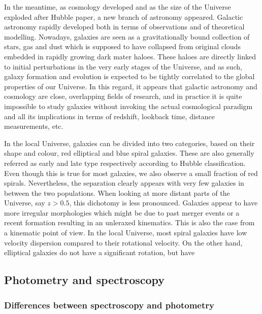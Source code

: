 In the meantime, as cosmology developed and as the size of the Universe exploded after Hubble paper, a new branch of astronomy appeared. Galactic astronomy rapidly developed both in terms of observations and of theoretical modelling. Nowadays, galaxies are seen as a gravitationally bound collection of stars, gas and dust which is supposed to have collapsed from original clouds embedded in rapidly growing dark mater haloes. These haloes are directly linked to initial perturbations in the very early stages of the Universe, and as such, galaxy formation and evolution is expected to be tightly correlated to the global properties of our Universe. In this regard, it appears that galactic astronomy and cosmology are close, overlapping fields of research, and in practice it is quite impossible to study galaxies without invoking the actual cosmological paradigm and all its implications in terms of redshift, lookback time, distance measurements, etc.

In the local Universe, galaxies can be divided into two categories, based on their shape and colour, red elliptical and blue spiral galaxies. These are also generally referred as early and late type respectively according to Hubble classification. Even though this is true for most galaxies, we also observe a small fraction of red spirals. Nevertheless, the separation clearly appears with very few galaxies in between the two populations. When looking at more distant parts of the Universe, say $z > 0.5$, this dichotomy is less pronounced. Galaxies appear to have more irregular morphologies which might be due to past merger events or a recent formation resulting in an unleraxed kinematics. This is also the case from a kinematic point of view. In the local Universe, most spiral galaxies have low velocity dispersion compared to their rotational velocity. On the other hand, elliptical galaxies do not have a significant rotation, but have 


\subsection{Photometry and spectroscopy}
\label{subsec:diffPhotSpec}

\subsubsection{Differences between spectroscopy and photometry}
\label{subsubsec:photo_data}

